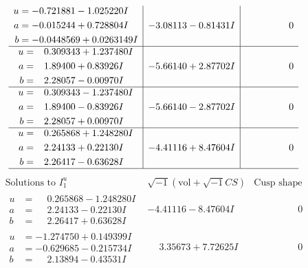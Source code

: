 \documentclass[1p]{elsarticle_modified}
\theoremstyle{definition}
\newcommand{\I}{\sqrt{-1}}
\begin{document}
$$\begin{array}{c|c|c}
\begin{aligned}
u &= -0.721881 - 1.025220 I \\
a &= -0.015244 + 0.728804 I \\
b &= -0.0448569 + 0.0263149 I\end{aligned}
 & -3.08113 - 0.81431 I & \phantom{-0.000000 } 0 \\ \hline\begin{aligned}
u &= \phantom{-}0.309343 + 1.237480 I \\
a &= \phantom{-}1.89400 + 0.83926 I \\
b &= \phantom{-}2.28057 - 0.00970 I\end{aligned}
 & -5.66140 + 2.87702 I & \phantom{-0.000000 } 0 \\ \hline\begin{aligned}
u &= \phantom{-}0.309343 - 1.237480 I \\
a &= \phantom{-}1.89400 - 0.83926 I \\
b &= \phantom{-}2.28057 + 0.00970 I\end{aligned}
 & -5.66140 - 2.87702 I & \phantom{-0.000000 } 0 \\ \hline\begin{aligned}
u &= \phantom{-}0.265868 + 1.248280 I \\
a &= \phantom{-}2.24133 + 0.22130 I \\
b &= \phantom{-}2.26417 - 0.63628 I\end{aligned}
 & -4.41116 + 8.47604 I & \phantom{-0.000000 } 0\\
 \hline 
 \end{array}$$\newpage$$\begin{array}{c|c|c}  
\text{Solutions to }I^u_{1}& \I (\text{vol} + \sqrt{-1}CS) & \text{Cusp shape}\\
 \hline 
\begin{aligned}
u &= \phantom{-}0.265868 - 1.248280 I \\
a &= \phantom{-}2.24133 - 0.22130 I \\
b &= \phantom{-}2.26417 + 0.63628 I\end{aligned}
 & -4.41116 - 8.47604 I & \phantom{-0.000000 } 0 \\ \hline\begin{aligned}
u &= -1.274750 + 0.149399 I \\
a &= -0.629685 - 0.215734 I \\
b &= \phantom{-}2.13894 - 0.43531 I\end{aligned}
 & \phantom{-}3.35673 + 7.72625 I & \phantom{-0.000000 } 0 \\ \hline\begin{aligned}

\end{aligned}
\end{array}$$
\end{document}
